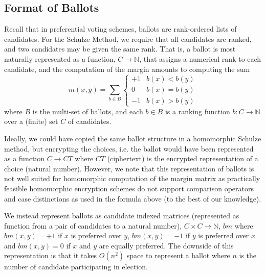 \subsection{Format of Ballots} 
Recall that in preferential voting
schemes, ballots are rank-ordered lists of candidates. For the
Schulze Method, we require that all candidates are ranked, and two
candidates may be given the same rank. That is, a ballot is most
naturally represented as a function, $C \to \mathbb{N}$, that assigns a
numerical rank to each candidate, and the computation of the margin
amounts to computing the sum
\[ m(x, y) = \sum_{b \in B} \begin{cases} +1 & b(x) < b(y) \\ 0 &
b(x) = b(y) \\ -1 & b(x) > b(y) \end{cases} \]
where $B$ is the multi-set of ballots, and each $b \in B$ is a
ranking function $b: C \to  \mathbb{N}$ over a (finite) set $C$ of
candidates. 

Ideally, we could have copied the same ballot structure in a homomorphic Schulze method, 
but encrypting the choices, i.e. the ballot would have been represented as a function $C \to CT$
where $CT$ (ciphertext) is the encrypted representation of a choice (natural number).
However, we note that this representation of ballots is not well suited for
homomorphic computation of the margin matrix as practically feasible
homomorphic encryption schemes do not support comparison operators
and case distinctions as used in the formula above (to the best of our knowledge).

We instead represent ballots as candidate indexed matrices (represented as function from a pair of candidates to a natural number), 
$C \times C \to \mathbb{N}$,
$bm$ where $bm(x, y) = +1$ if $x$ is preferred
over $y$, $bm(x, y) = -1$ if $y$ is preferred over $x$ and $bm(x, y) =
0$ if $x$ and $y$ are equally preferred. The downside of this representation 
is that it takes $O(n^2)$ space to represent a ballot where $n$ is the number 
of candidate participating in election. 

